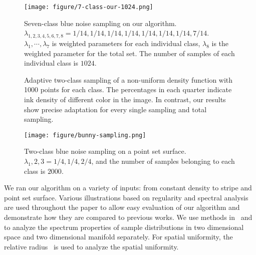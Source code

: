 \begin{figure*}[htb]
  \centering
  \texttt{[image: figure/7-class-our-1024.png]}

  \caption{Seven-class blue noise sampling on our algorithm.
  $\lambda_{1,2,3,4,5,6,7,8}=1/14,1/14,1/14,1/14,1/14,1/14,1/14,7/14$.
  $\lambda_1,\cdots,\lambda_7$ is weighted parameters for each individual class,
  $\lambda_8$ is the weighted parameter for the total set.
  The number of samples of each individual class is $1024$.}\label{seven-class-sampling}
\end{figure*}

\begin{figure}[htb]
  \centering
  \caption{Adaptive two-class sampling of a non-uniform density function with 1000 points for each class.
  The percentages in each quarter indicate ink density of different color in the image. In contrast,
  our results show precise adaptation for every single sampling and total sampling.}\label{adaptive sampling}
\end{figure}

\begin{figure}[htb]
  \centering
  \texttt{[image: figure/bunny-sampling.png]}
  \caption{Two-class blue noise sampling on a point set surface.
  $\lambda_1,2,3=1/4,1/4,2/4$, and the number of samples belonging to each class is $2000$.  }\label{bunny-sampling}
\end{figure}
We ran our algorithm on a variety of inputs:
from constant density to stripe and point set surface.
Various illustrations based on regularity and spectral analysis are
used throughout the paper to allow easy evaluation of our algorithm and  demonstrate how they  are compared to previous works.
We use methods in~\cite{schlomer:2011:accurate} and~\cite{wei:2011:differential} to analyze the
spectrum properties of sample distributions in two dimensional space and two dimensional manifold separately.
For spatial uniformity,
the relative radius~\cite{Lagae:2008:CPDD} is used to analyze the spatial uniformity.

